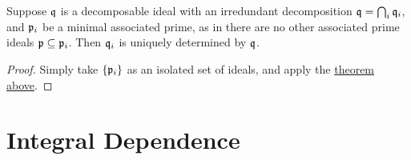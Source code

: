 \begin{corollary}
    Suppose \(\mathfrak{q}\) is a decomposable ideal with an irredundant decomposition \(\mathfrak{q} = \bigcap_i \mathfrak{q}_i\),
    and \(\mathfrak{p}_i\) be a minimal associated prime,
    as in there are no other associated prime ideals \(\mathfrak{p} \subseteq \mathfrak{p}_i\).
    Then \(\mathfrak{q}_i\) is uniquely determined by \(\mathfrak{q}\).
\end{corollary}
\begin{proof}
    Simply take \(\{\mathfrak{p}_i\}\) as an isolated set of ideals,
    and apply the \hyperref[thm:primary-uniqueness-2]{theorem above}.
\end{proof}


\section{Integral Dependence}


